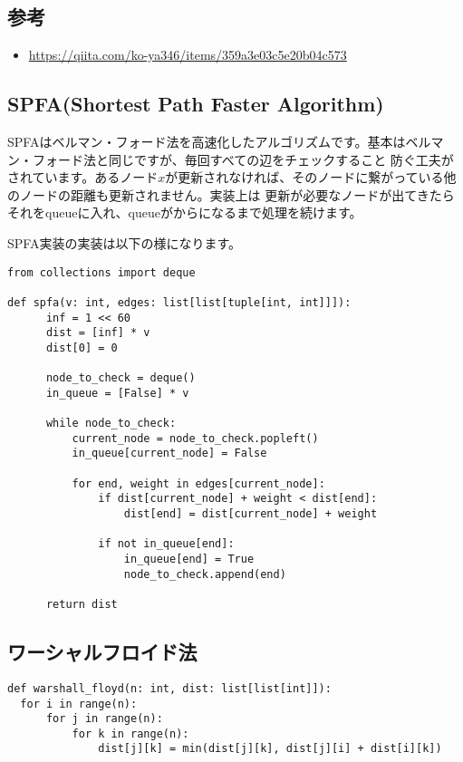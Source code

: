\documentclass{jlreq}
\begin{document}
\subsection{参考}

\begin{itemize}
  \item \url{https://qiita.com/ko-ya346/items/359a3e03c5e20b04c573}
\end{itemize}

\newpage

\subsection{SPFA(Shortest Path Faster Algorithm)}
SPFAはベルマン・フォード法を高速化したアルゴリズムです。基本はベルマン・フォード法と同じですが、毎回すべての辺をチェックすること
防ぐ工夫がされています。あるノード$x$が更新されなければ、そのノードに繋がっている他のノードの距離も更新されません。実装上は
更新が必要なノードが出てきたらそれをqueueに入れ、queueがからになるまで処理を続けます。

SPFA実装の実装は以下の様になります。

\begin{lstlisting}[caption=SPFAの実装, label=spfa, frame=TRBL, label={spfa}]
from collections import deque

def spfa(v: int, edges: list[list[tuple[int, int]]]):
      inf = 1 << 60
      dist = [inf] * v
      dist[0] = 0
      
      node_to_check = deque()
      in_queue = [False] * v
      
      while node_to_check:
          current_node = node_to_check.popleft()
          in_queue[current_node] = False
          
          for end, weight in edges[current_node]:
              if dist[current_node] + weight < dist[end]:
                  dist[end] = dist[current_node] + weight 
              
              if not in_queue[end]:
                  in_queue[end] = True
                  node_to_check.append(end)
      
      return dist
\end{lstlisting}

\newpage

\subsection{ワーシャルフロイド法}
\begin{lstlisting}[caption=ワーシャルフロイド法の実装, label=warshall, frame=TRBL, label={warshall}]
def warshall_floyd(n: int, dist: list[list[int]]):
  for i in range(n):
      for j in range(n):
          for k in range(n):
              dist[j][k] = min(dist[j][k], dist[j][i] + dist[i][k])
\end{lstlisting}
\end{document}
